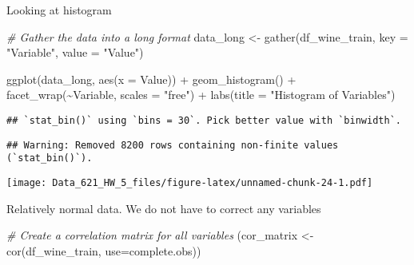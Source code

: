 \documentclass[
]{article}
\newenvironment{Shaded}{\begin{snugshade}}{\end{snugshade}}
\newcommand{\AttributeTok}[1]{\textcolor[rgb]{0.77,0.63,0.00}{#1}}
\newcommand{\CommentTok}[1]{\textcolor[rgb]{0.56,0.35,0.01}{\textit{#1}}}
\newcommand{\FunctionTok}[1]{\textcolor[rgb]{0.00,0.00,0.00}{#1}}
\newcommand{\NormalTok}[1]{#1}
\newcommand{\OtherTok}[1]{\textcolor[rgb]{0.56,0.35,0.01}{#1}}
\newcommand{\SpecialCharTok}[1]{\textcolor[rgb]{0.00,0.00,0.00}{#1}}
\newcommand{\StringTok}[1]{\textcolor[rgb]{0.31,0.60,0.02}{#1}}
\begin{document}
Looking at histogram

\begin{Shaded}
\begin{Highlighting}[]
\CommentTok{\# Gather the data into a long format}
\NormalTok{data\_long }\OtherTok{\textless{}{-}} \FunctionTok{gather}\NormalTok{(df\_wine\_train, }\AttributeTok{key =} \StringTok{"Variable"}\NormalTok{, }\AttributeTok{value =} \StringTok{"Value"}\NormalTok{)}

\FunctionTok{ggplot}\NormalTok{(data\_long, }\FunctionTok{aes}\NormalTok{(}\AttributeTok{x =}\NormalTok{ Value)) }\SpecialCharTok{+}
  \FunctionTok{geom\_histogram}\NormalTok{() }\SpecialCharTok{+}
  \FunctionTok{facet\_wrap}\NormalTok{(}\SpecialCharTok{\textasciitilde{}}\NormalTok{Variable, }\AttributeTok{scales =} \StringTok{"free"}\NormalTok{) }\SpecialCharTok{+}
  \FunctionTok{labs}\NormalTok{(}\AttributeTok{title =} \StringTok{"Histogram of Variables"}\NormalTok{)}
\end{Highlighting}
\end{Shaded}

\begin{verbatim}
## `stat_bin()` using `bins = 30`. Pick better value with `binwidth`.
\end{verbatim}

\begin{verbatim}
## Warning: Removed 8200 rows containing non-finite values (`stat_bin()`).
\end{verbatim}

\texttt{[image: Data\_621\_HW\_5\_files/figure-latex/unnamed-chunk-24-1.pdf]}

Relatively normal data. We do not have to correct any variables

\begin{Shaded}
\begin{Highlighting}[]
\CommentTok{\# Create a correlation matrix for all variables}
\NormalTok{(cor\_matrix }\OtherTok{\textless{}{-}} \FunctionTok{cor}\NormalTok{(df\_wine\_train, }\AttributeTok{use=}\StringTok{\textquotesingle{}complete.obs\textquotesingle{}}\NormalTok{))}
\end{Highlighting}
\end{Shaded}
\end{document}

